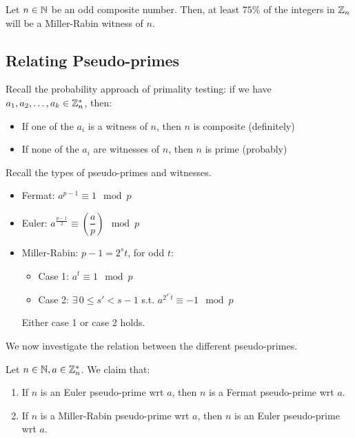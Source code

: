 \documentclass{article}
\begin{document}
\begin{lm}
    Let $ n \in \mathbb{N} $ be an odd composite number.
    Then, at least $ 75\% $ of the integers in $ \mathbb{Z}_{n} $ will be a Miller-Rabin witness
    of $ n $.
\end{lm}

\subsection{Relating Pseudo-primes}


Recall the probability approach of primality testing:
if we have $ a_{1}, a_{2}, \dots, a_{k} \in \mathbb{Z}_{n}^{*} $, then:
\begin{itemize}
    \item If one of the $ a_{i} $ is a witness of $ n $, then $ n $ is composite (definitely)
    \item If none of the $ a_{i} $ are witnesses of $ n $, then $ n $ is prime (probably)
\end{itemize}
Recall the types of pseudo-primes and witnesses.
\begin{itemize}
    \item Fermat: $ a^{p-1} \equiv 1 \mod p $
    \item Euler: $ a^{\frac{p-1}{2}} \equiv \left( \dfrac{a}{p} \right) \mod p $
    \item Miller-Rabin: $ p-1 = 2^{s}t $, for odd $ t $:
    \begin{itemize}
        \item Case 1: $ a^{t} \equiv 1 \mod p $
        \item Case 2: $ \exists \, 0 \leq s' < s - 1 $ s.t. $ a^{2^{s'}t} \equiv -1 \mod p $
    \end{itemize}
    Either case 1 or case 2 holds.
\end{itemize}
We now investigate the relation between the different pseudo-primes.

\begin{thm}
    Let $ n \in \mathbb{N}, a \in \mathbb{Z}_{n}^{*} $. We claim that:
    \begin{enumerate}
        \item If $ n $ is an Euler pseudo-prime wrt $ a $, then
            $ n $ is a Fermat pseudo-prime wrt $ a $.
        \item If $ n $ is a Miller-Rabin pseudo-prime wrt $ a $, then
            $ n $ is an Euler pseudo-prime wrt $ a $.
    \end{enumerate}
\end{thm}
\end{document}
